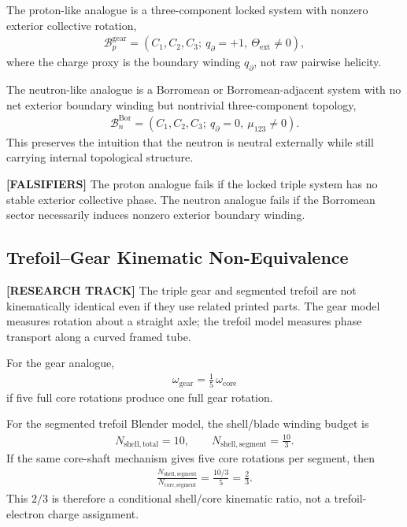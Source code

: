 The proton-like analogue is a three-component locked system with nonzero exterior collective rotation,
\begin{align}
    \mathcal{B}_{p}^{\mathrm{gear}}
    =
    (C_1,C_2,C_3;\ q_{\partial}=+1,\ \Theta_{\mathrm{ext}}\neq 0),
\end{align}
where the charge proxy is the boundary winding $q_{\partial}$, not raw pairwise helicity.

The neutron-like analogue is a Borromean or Borromean-adjacent system with no net exterior boundary winding but nontrivial three-component topology,
\begin{align}
    \mathcal{B}_{n}^{\mathrm{Bor}}
    =
    (C_1,C_2,C_3;\ q_{\partial}=0,\ \mu_{123}\neq 0).
\end{align}
This preserves the intuition that the neutron is neutral externally while still carrying internal topological structure.

\textbf{[FALSIFIERS]} The proton analogue fails if the locked triple system has no stable exterior collective phase. The neutron analogue fails if the Borromean sector necessarily induces nonzero exterior boundary winding.

\subsection{Trefoil--Gear Kinematic Non-Equivalence}
\label{subsec:rt_trefoil_gear_kinematic_nonequivalence}

\textbf{[RESEARCH TRACK]} The triple gear and segmented trefoil are not kinematically identical even if they use related printed parts. The gear model measures rotation about a straight axle; the trefoil model measures phase transport along a curved framed tube.

For the gear analogue,
\begin{align}
    \omega_{\mathrm{gear}}
    =
    \frac{1}{5}\,\omega_{\mathrm{core}}
\end{align}
if five full core rotations produce one full gear rotation.

For the segmented trefoil Blender model, the shell/blade winding budget is
\begin{align}
    N_{\mathrm{shell,total}}=10,
    \qquad
    N_{\mathrm{shell,segment}}=\frac{10}{3}.
\end{align}
If the same core-shaft mechanism gives five core rotations per segment, then
\begin{align}
    \frac{N_{\mathrm{shell,segment}}}{N_{\mathrm{core,segment}}}
    =
    \frac{10/3}{5}
    =
    \frac{2}{3}.
\end{align}
This $2/3$ is therefore a conditional shell/core kinematic ratio, not a trefoil-electron charge assignment.

